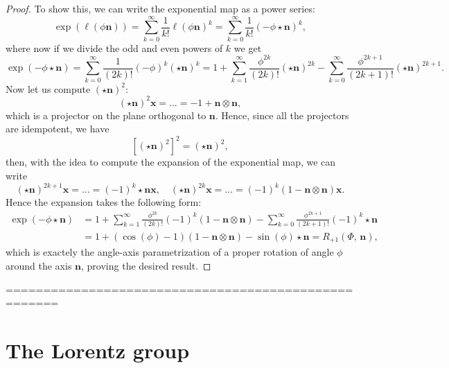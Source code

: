 \begin{proof}
    To show this, we can write the exponential map as a power series:
    \[
        \exp(\ell(\phi\mathbf{n})) = \sum_{k=0}^{\infty} \frac{1}{k!} \ell(\phi\mathbf{n})^k = \sum_{k=0}^{\infty} \frac{1}{k!} (-\phi \star \mathbf{n})^k,
    \]
    where now if we divide the odd and even powers of \(k\) we get
    \[
        \exp(-\phi \star \mathbf{n}) = \sum_{k=0}^{\infty} \frac{1}{(2k)!} (-\phi)^k (\star \mathbf{n})^{k} = 1 + \sum_{k=1}^{\infty} \frac{\phi^{2k}}{(2k)!} (\star \mathbf{n})^{2k} - \sum_{k=0}^{\infty} \frac{\phi^{2k+1}}{(2k+1)!} (\star \mathbf{n})^{2k+1}.
    \]
    Now let us compute \((\star \mathbf{n})^2\):
    \[
        (\star \mathbf{n})^2 \mathbf{x} = \dots = -1 + \mathbf{n} \otimes \mathbf{n},
    \]
    which is a projector on the plane orthogonal to \(\mathbf{n}\). Hence, since all the projectors are idempotent, we have
    \[
        \left[ (\star \mathbf{n})^2 \right]^2 = (\star \mathbf{n})^2,
    \]
    then, with the idea to compute the expansion of the exponential map, we can write
    \[
        (\star \mathbf{n})^{2k + 1}\mathbf{x} = \dots = (-1)^k \star \mathbf{n} \mathbf{x}, \quad (\star \mathbf{n})^{2k}\mathbf{x} = \dots = (-1)^k (1 - \mathbf{n} \otimes \mathbf{n}) \mathbf{x}.
    \]
    Hence the expansion takes the following form:
    \[
        \begin{aligned}
            \exp(-\phi \star \mathbf{n}) & = 1 + \sum_{k=1}^{\infty} \frac{\phi^{2k}}{(2k)!} (-1)^k (1 - \mathbf{n} \otimes \mathbf{n}) - \sum_{k=0}^{\infty} \frac{\phi^{2k+1}}{(2k+1)!} (-1)^k \star \mathbf{n} \\
                                         & = 1 + (\cos(\phi) - 1) (1 - \mathbf{n} \otimes \mathbf{n}) - \sin(\phi) \star \mathbf{n} = R_{+1}(\Phi,\,\mathbf{n}),
        \end{aligned}
    \]
    which is exactely the angle-axis parametrization of a proper rotation of angle \(\phi\) around the axis \(\mathbf{n}\), proving the desired result.
\end{proof}






=====================================================






\section{The Lorentz group}

